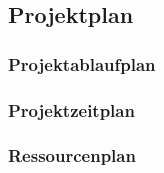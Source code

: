 \subsection{Projektplan}
\subsubsection{Projektablaufplan}

\subsubsection{Projektzeitplan}

\subsubsection{Ressourcenplan}
